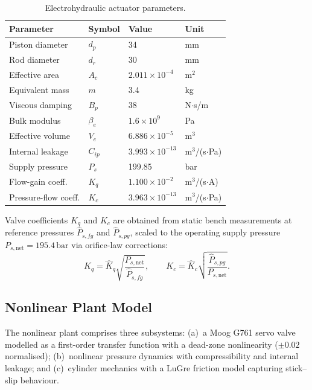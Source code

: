 \documentclass[12pt,a4paper]{article}
\theoremstyle{plain}
\theoremstyle{definition}
\theoremstyle{remark}
\begin{document}
\begin{table}[htbp]
\centering
\caption{Electrohydraulic actuator parameters.}
\label{tab:params}
\begin{tabular}{llll}
\toprule
Parameter & Symbol & Value & Unit \\
\midrule
Piston diameter   & $d_p$     & 34                & mm \\
Rod diameter      & $d_r$     & 30                & mm \\
Effective area    & $A_c$     & $2.011\times10^{-4}$ & m$^2$ \\
Equivalent mass   & $m$       & 3.4               & kg \\
Viscous damping   & $B_p$     & 38                & N$\cdot$s/m \\
Bulk modulus      & $\beta_e$ & $1.6\times10^{9}$ & Pa \\
Effective volume  & $V_e$     & $6.886\times10^{-5}$ & m$^3$ \\
Internal leakage  & $C_{ip}$  & $3.993\times10^{-13}$ & m$^3$/(s$\cdot$Pa) \\
Supply pressure   & $P_s$     & 199.85            & bar \\
Flow-gain coeff.  & $K_q$     & $1.100\times10^{-2}$ & m$^3$/(s$\cdot$A) \\
Pressure-flow coeff. & $K_c$ & $3.963\times10^{-13}$ & m$^3$/(s$\cdot$Pa) \\
\bottomrule
\end{tabular}
\end{table}

Valve coefficients $K_q$ and $K_c$ are obtained from static bench
measurements at reference pressures $\hat P_{s,fg}$ and
$\hat P_{s,pg}$, scaled to the operating supply pressure
$P_{s,\mathrm{net}}=195.4\,\mathrm{bar}$ via orifice-law corrections:
\begin{equation}
K_q = \hat K_q\sqrt{\frac{P_{s,\mathrm{net}}}{\hat P_{s,fg}}}, \qquad
K_c = \hat K_c\sqrt{\frac{\hat P_{s,pg}}{P_{s,\mathrm{net}}}}.
\end{equation}

\subsection{Nonlinear Plant Model}

The nonlinear plant comprises three subsystems: (a)~a Moog G761 servo
valve modelled as a first-order transfer function with a
dead-zone nonlinearity ($\pm0.02$ normalised); (b)~nonlinear pressure
dynamics with compressibility and internal leakage; and (c)~cylinder
mechanics with a LuGre friction model capturing stick--slip behaviour.
\end{document}
